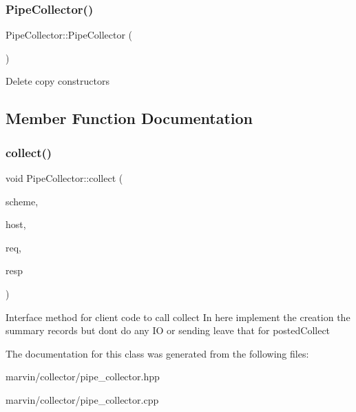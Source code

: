 \subsubsection{\texorpdfstring{Pipe\+Collector()}{PipeCollector()}}
{\footnotesize\ttfamily Pipe\+Collector\+::\+Pipe\+Collector (\begin{DoxyParamCaption}\item[{\hyperlink{class_pipe_collector}{Pipe\+Collector} const \&}]{ }\end{DoxyParamCaption})\hspace{0.3cm}{\ttfamily [delete]}}

Delete copy constructors 

\subsection{Member Function Documentation}
\mbox{\label{class_pipe_collector_a4deab58d1636c9af54146df61f4d244c}} 
\subsubsection{\texorpdfstring{collect()}{collect()}}
{\footnotesize\ttfamily void Pipe\+Collector\+::collect (\begin{DoxyParamCaption}\item[{std\+::string \&}]{scheme,  }\item[{std\+::string \&}]{host,  }\item[{Message\+Reader\+S\+Ptr}]{req,  }\item[{Message\+Writer\+S\+Ptr}]{resp }\end{DoxyParamCaption})}

Interface method for client code to call collect In here implement the creation the summary records but dont do any IO or sending leave that for posted\+Collect

The documentation for this class was generated from the following files\+:\begin{DoxyCompactItemize}
\item 
marvin/collector/pipe\+\_\+collector.\+hpp\item 
marvin/collector/pipe\+\_\+collector.\+cpp\end{DoxyCompactItemize}
